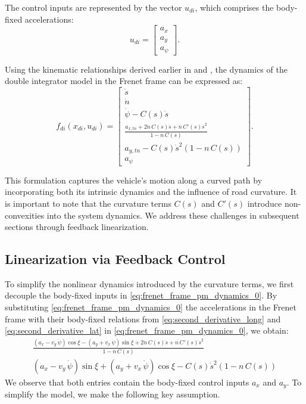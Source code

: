 The control inputs are represented by the vector \(u_{di}\), which comprises the body-fixed accelerations:
\begin{equation}
	u_{di} = \begin{bmatrix}
		a_x \\
		a_y \\
		a_\psi
	\end{bmatrix}.
\end{equation}

Using the kinematic relationships derived earlier in  and , the dynamics of the double integrator model in the Frenet frame can be expressed as:
\begin{equation}
	\label{eq:frenet_frame_pm_dynamics_0}
	f_{di}(x_{di}, u_{di}) = \begin{bmatrix}
		\dot{s}                                                                                \\
		\dot{n}                                                                                \\
		\dot{\psi} - C(s)\dot{s}                                                               \\
		\displaystyle \frac{a_{x,tn} + 2\dot{n}\,C(s)\dot{s} + n\,C'(s)\dot{s}^2}{1 - n\,C(s)} \\
		a_{y,tn} - C(s)\dot{s}^2(1 - n\,C(s))                                                  \\
		a_\psi
	\end{bmatrix}.
\end{equation}

This formulation captures the vehicle's motion along a curved path by incorporating both its intrinsic dynamics and the influence of road curvature.
It is important to note that the curvature terms \(C(s)\) and \(C'(s)\) introduce non-convexities into the system dynamics.
We address these challenges in subsequent sections through feedback linearization.

\subsection{Linearization via Feedback Control} \label{subsec:constraints}
To simplify the nonlinear dynamics introduced by the curvature terms, we first decouple the body-fixed inputs in
\eqref{eq:frenet_frame_pm_dynamics_0}.
By substituting \eqref{eq:frenet_frame_pm_dynamics_0} the accelerations in the Frenet frame with their body-fixed relations from
\eqref{eq:second_derivative_long} and \eqref{eq:second_derivative_lat} in \eqref{eq:frenet_frame_pm_dynamics_0}, we obtain:
\begin{align}
	\frac{(a_x - v_y\,\dot{\psi})\cos{\xi} - (a_y + v_x\,\dot{\psi})\sin{\xi} + 2\dot{n}\,C(s)\dot{s} + n\,C'(s)\dot{s}^2}{1 - n\,C(s)} \\
	(a_x - v_y\,\dot{\psi})\sin{\xi} + (a_y + v_x\,\dot{\psi})\cos{\xi} - C(s)\dot{s}^2(1 - n\,C(s))
\end{align}
We observe that both entries contain the body-fixed control inputs \(a_x\) and \(a_y\).
To simplify the model, we make the following key assumption.

